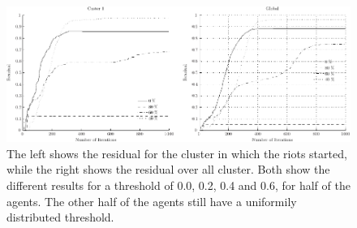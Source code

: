 \begin{figure}
  \centering
  \includegraphics[width= \textwidth]{influenceOffixedthresholds/thresholdinfuence.pdf}
  \caption{The left shows the residual for the cluster in which the riots started, while the right shows the residual over all cluster. Both show the different results for a threshold of 0.0, 0.2, 0.4 and 0.6, for half of the agents. The other half of the agents still have a uniformily distributed threshold.} 
  \label{influencethresholdplot}
\end{figure}





